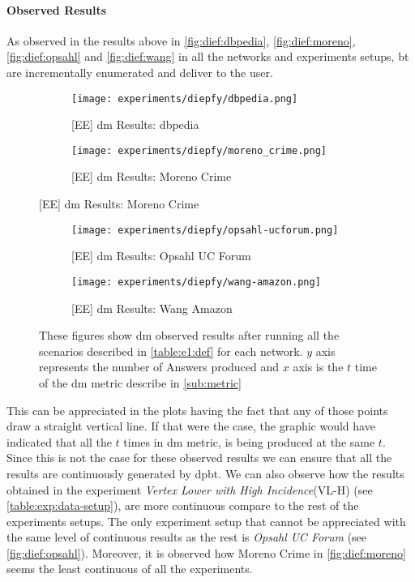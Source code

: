  \paragraph{Observed Results}\label{sub:sec:res:e1}
 As observed in the results above in \autoref{fig:dief:dbpedia}, \autoref{fig:dief:moreno}, \autoref{fig:dief:opsahl} and \autoref{fig:dief:wang} in all the networks and experiments setups, \acrshort{bt} are incrementally enumerated and deliver to the user. 

 \begin{figure}[!htb]
  \centering
  \begin{subfigure}{0.5\textwidth}
   \texttt{[image: experiments/diepfy/dbpedia.png]}
    \caption{{[EE] \acrshort{dm} Results: \acrshort{dbpedia}}}
    \label{fig:dief:dbpedia}
  \end{subfigure}%
  \begin{subfigure}{0.5\textwidth}
   \texttt{[image: experiments/diepfy/moreno\_crime.png]}
    \caption{{[EE] \acrshort{dm} Results: Moreno Crime}}
    \label{fig:dief:moreno}
  \end{subfigure}
\end{figure}
%
\begin{figure}[!htb]
  \centering
  \begin{subfigure}{0.5\textwidth}
   \texttt{[image: experiments/diepfy/opsahl-ucforum.png]}
    \caption{{[EE] \acrshort{dm} Results: Opsahl UC Forum}}
    \label{fig:dief:opsahl}
  \end{subfigure}%
  \begin{subfigure}{0.5\textwidth}
    \texttt{[image: experiments/diepfy/wang-amazon.png]}
     \caption{{[EE] \acrshort{dm} Results: Wang Amazon}}
     \label{fig:dief:wang}
   \end{subfigure}
   \caption[{[EE] \acrshort{dm} General Results}]{These figures show \acrshort{dm} observed results after running all the scenarios described in \autoref{table:e1:def} for each network. $y$ axis represents the number of Answers produced and $x$ axis is the $t$ time of the \acrshort{dm} metric describe in \autoref{sub:metric}}
 \end{figure}

This can be appreciated in the plots having the fact that any of those points draw a straight vertical line. If that were the case, the graphic would have indicated that all the $t$ times in \acrshort{dm} metric, is being produced at the same $t$.
Since this is not the case for these observed results we can ensure that all the results are continuously generated by \acrshort{dpbt}.
We can also observe how the results obtained in the experiment \emph{Vertex Lower with High Incidence}(VL-H) (see \autoref{table:exp:data-setup}), are more continuous compare to the rest of the experiments setups. 
The only experiment setup that cannot be appreciated with the same level of continuous results as the rest is \emph{Opsahl UC Forum} (see \autoref{fig:dief:opsahl}). 
Moreover, it is observed how Moreno Crime in \autoref{fig:dief:moreno} seems the least continuous of all the experiments. 

